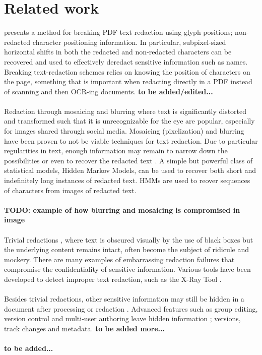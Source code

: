 \chapter{Related work}

\cite{bland2022story} presents a method for breaking PDF text redaction using glyph positions; non-redacted character positioning information. In particular, subpixel-sized horizontal shifts in both the redacted and non-redacted characters can be recovered and used to effectively deredact sensitive information such as names. Breaking text-redaction schemes relies on knowing the position of characters on the page, something that is important when redacting directly in a PDF instead of scanning and then OCR-ing documents. \textbf{to be added/edited...}
\\\\
Redaction through mosaicing and blurring where text is significantly distorted and transformed such that it is unrecognizable for the eye are popular, especially for images shared through social media. Mosaicing (pixelization) and blurring have been proven to not be viable techniques for text redaction. Due to particular regularities in text, enough information may remain to narrow down the possibilities or even to recover the redacted text \cite{hill2016effectiveness}. A simple but powerful class of statistical models, Hidden Markov Models, can be used to recover both short and indefinitely long instances of redacted text. HMMs are used to reover sequences of characters from images of redacted text. 
\\\\
\textbf{TODO: example of how blurring and mosaicing is compromised in image}
\\\\
Trivial redactions \cite{forrester2005investigation}, where text is obscured visually by the use of black boxes but the underlying content remains intact, often become the subject of ridicule and mockery. There are many examples of embarrassing redaction failures \cite{failures2019} that compromise the confidentiality of  sensitive information. Various tools have been developed to detect improper text redaction, such as the X-Ray Tool \cite{Xray2021}.
\\\\
Besides trivial redactions, other sensitive information may still be hidden in a document after processing or redaction \cite{muller2021processing}. Advanced features such as group editing, version control and multi-user authoring leave hidden information \cite{forrester2005investigation}; versions, track changes and metadata. \textbf{to be added more...}
\\\\
\textbf{to be added...}
